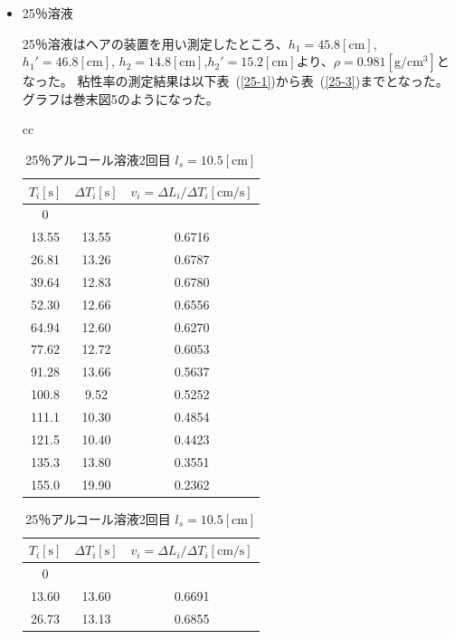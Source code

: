 \documentclass[a4j,10pt]{jarticle}
\newcommand{\Tabref}[1]{表~(\ref{#1})}
\begin{document}
\begin{itemize}
\item 25％溶液

25％溶液はヘアの装置を用い測定したところ、$h_1=45.8\mathrm{[cm]}$,$h_{1}'=46.8\mathrm{[cm]}$,
$h_2=14.8\mathrm{[cm]}$,$h_{2}'=15.2\mathrm{[cm]}$より、$\rho=0.981\mathrm{[g/cm^3]}$となった。
粘性率の測定結果は以下\Tabref{25-1}から\Tabref{25-3}までとなった。
グラフは巻末図5のようになった。
\begin{table}[h]
\begin{tabular}{cc}
\begin{minipage}{.5\hsize}
\begin{center}
\caption{25％アルコール溶液1回目 $l_s=10.5[\mathrm{cm}]$}
\label{25-1}
\begin{tabular}{|c|c|c|} \hline
  $T_i[\mathrm s]$ & $\Delta T_i[\mathrm s]$ & $v_i=\Delta L_i/\Delta T_i\mathrm{[cm/s]}$ \\ \hline \hline
  0&&\\\hline
  13.55&13.55&0.6716 \\ \hline
  26.81&13.26&0.6787 \\ \hline
  39.64&12.83&0.6780 \\ \hline
  52.30&12.66&0.6556 \\ \hline
  64.94&12.60&0.6270 \\ \hline
  77.62&12.72&0.6053 \\ \hline
  91.28&13.66&0.5637 \\ \hline
  100.8&9.52&0.5252  \\ \hline
  111.1&10.30&0.4854  \\ \hline
  121.5&10.40&0.4423  \\ \hline
  135.3&13.80&0.3551  \\ \hline
  155.0&19.90&0.2362  \\ \hline
\end{tabular}
\end{center}
\end{minipage}
\begin{minipage}{.5\hsize}
\begin{center}
\caption{25％アルコール溶液2回目 $l_s=10.5[\mathrm{cm}]$}
\label{25-2}
\begin{tabular}{|c|c|c|} \hline
  $T_i[\mathrm s]$ & $\Delta T_i[\mathrm s]$ & $v_i=\Delta L_i/\Delta T_i\mathrm{[cm/s]}$ \\ \hline \hline
  0&&\\\hline
  13.60&13.60&0.6691 \\ \hline
  26.73&13.13&0.6855 \\ \hline

\end{tabular}
\end{center}
\end{minipage}
\end{tabular}
\end{table}
\end{itemize}
\end{document}

